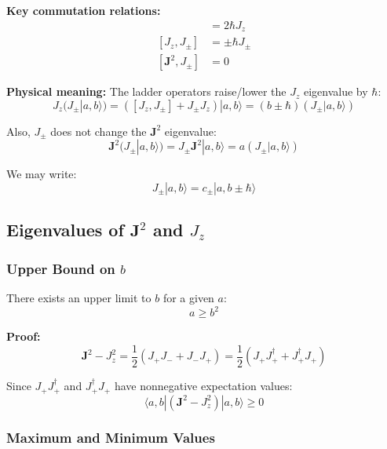 \documentclass[11pt,a4paper]{article}
\begin{document}
\textbf{Key commutation relations:}
\begin{align}
[J_+, J_-] &= 2\hbar J_z \tag{3.158a} \\
[J_z, J_\pm] &= \pm\hbar J_\pm \tag{3.158b} \\
[\mathbf{J}^2, J_\pm] &= 0 \tag{3.159}
\end{align}

\textbf{Physical meaning:} The ladder operators raise/lower the $J_z$ eigenvalue by $\hbar$:
\begin{equation}
J_z(J_\pm|a, b\rangle) = ([J_z, J_\pm] + J_\pm J_z)|a, b\rangle = (b \pm \hbar)(J_\pm|a, b\rangle)
\tag{3.160}
\end{equation}

Also, $J_\pm$ does not change the $\mathbf{J}^2$ eigenvalue:
\begin{equation}
\mathbf{J}^2(J_\pm|a, b\rangle) = J_\pm\mathbf{J}^2|a, b\rangle = a(J_\pm|a, b\rangle)
\tag{3.163}
\end{equation}

We may write:
\begin{equation}
J_\pm|a, b\rangle = c_\pm|a, b \pm \hbar\rangle
\tag{3.164}
\end{equation}

\subsection{Eigenvalues of $\mathbf{J}^2$ and $J_z$}

\subsubsection{Upper Bound on $b$}

There exists an upper limit to $b$ for a given $a$:
\begin{equation}
a \geq b^2
\tag{3.165}
\end{equation}

\textbf{Proof:}
\begin{equation}
\mathbf{J}^2 - J_z^2 = \frac{1}{2}(J_+ J_- + J_- J_+) = \frac{1}{2}(J_+ J_+^\dagger + J_+^\dagger J_+)
\tag{3.166}
\end{equation}

Since $J_+ J_+^\dagger$ and $J_+^\dagger J_+$ have nonnegative expectation values:
\begin{equation}
\langle a, b|(\mathbf{J}^2 - J_z^2)|a, b\rangle \geq 0
\tag{3.168}
\end{equation}

\subsubsection{Maximum and Minimum Values}
\end{document}

